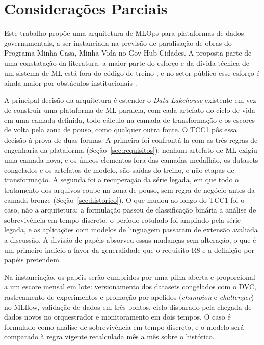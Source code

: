\chapter[Considerações Parciais]{Considerações Parciais}
\label{cap:consideracoes}

Este trabalho propõe uma arquitetura de MLOps para plataformas de dados governamentais, a ser instanciada na previsão de paralisação de obras do Programa Minha Casa, Minha Vida no Gov Hub Cidades. A proposta parte de uma constatação da literatura: a maior parte do esforço e da dívida técnica de um sistema de ML está fora do código de treino \cite{sculley2015}, e no setor público esse esforço é ainda maior por obstáculos institucionais \cite{ferreira2025}.

A principal decisão da arquitetura é estender o \textit{Data Lakehouse} existente em vez de construir uma plataforma de ML paralela, com cada artefato do ciclo de vida em uma camada definida, todo cálculo na camada de transformação e os escores de volta pela zona de pouso, como qualquer outra fonte. O TCC1 pôs essa decisão à prova de duas formas. A primeira foi confrontá-la com as três regras de engenharia da plataforma (Seção~\ref{sec:requisitos}): nenhum artefato de ML exigiu uma camada nova, e os únicos elementos fora das camadas medalhão, os datasets congelados e os artefatos de modelo, são saídas do treino, e não etapas de transformação. A segunda foi a recuperação da série legada, em que todo o tratamento dos arquivos coube na zona de pouso, sem regra de negócio antes da camada bronze (Seção~\ref{sec:historico}). O que mudou ao longo do TCC1 foi o caso, não a arquitetura: a formulação passou de classificação binária a análise de sobrevivência em tempo discreto, o período rotulado foi ampliado pela série legada, e as aplicações com modelos de linguagem passaram de extensão avaliada a discussão. A divisão de papéis absorveu essas mudanças sem alteração, o que é um primeiro indício a favor da generalidade que o requisito R8 e a definição por papéis pretendem.

Na instanciação, os papéis serão cumpridos por uma pilha aberta e proporcional a um escore mensal em lote: versionamento dos datasets congelados com o DVC, rastreamento de experimentos e promoção por apelidos (\textit{champion} e \textit{challenger}) no MLflow, validação de dados em três pontos, ciclo disparado pela chegada de dados novos no orquestrador e monitoramento em dois tempos. O caso é formulado como análise de sobrevivência em tempo discreto, e o modelo será comparado à regra vigente recalculada mês a mês sobre o histórico.

